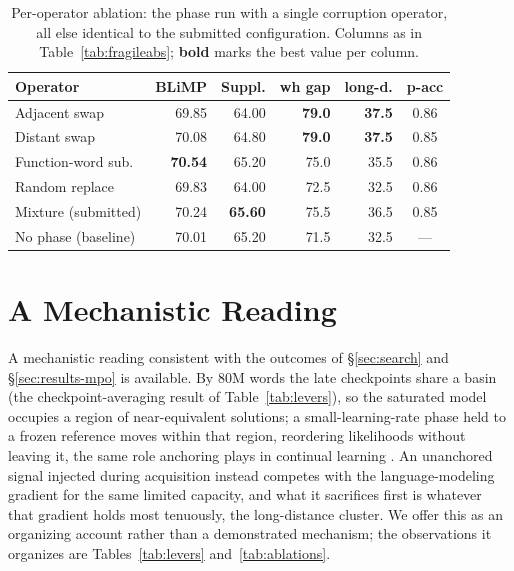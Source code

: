 \begin{table}[H]
  \centering
  \footnotesize
  \setlength{\tabcolsep}{2pt}
  \begin{tabular}{@{}lrrrrc@{}}
    \toprule
    \textbf{Operator} & \textbf{BLiMP} & \textbf{Suppl.} & \textbf{wh gap} & \textbf{long-d.} & \textbf{p-acc} \\
    \midrule
    Adjacent swap    & 69.85 & 64.00 & \textbf{79.0} & \textbf{37.5} & 0.86 \\
    Distant swap     & 70.08 & 64.80 & \textbf{79.0} & \textbf{37.5} & 0.85 \\
    Function-word sub. & \textbf{70.54} & 65.20 & 75.0 & 35.5 & 0.86 \\
    Random replace   & 69.83 & 64.00 & 72.5 & 32.5 & 0.86 \\
    \midrule
    Mixture (submitted) & 70.24 & \textbf{65.60} & 75.5 & 36.5 & 0.85 \\
    No phase (baseline) & 70.01 & 65.20 & 71.5 & 32.5 & --- \\
    \bottomrule
  \end{tabular}
  \caption{Per-operator ablation: the \MPO{} phase run with a single
  corruption operator, all else identical to the submitted configuration.
  Columns as in Table~\ref{tab:fragileabs}; \textbf{bold} marks the best
  value per column.}
  \label{tab:ops}
\end{table}



\section{A Mechanistic Reading}
\label{sec:app-mech}

A mechanistic reading consistent with the outcomes of \S\ref{sec:search}
and \S\ref{sec:results-mpo} is available. By 80M words the late
checkpoints share a basin (the checkpoint-averaging result of
Table~\ref{tab:levers}), so the saturated model occupies a region of
near-equivalent solutions; a small-learning-rate phase held to a frozen
reference moves within that region, reordering likelihoods without
leaving it, the same role anchoring plays in continual learning
\citep{kirkpatrick2017ewc}. An unanchored signal injected during
acquisition instead competes with the language-modeling gradient for the
same limited capacity, and what it sacrifices first is whatever that
gradient holds most tenuously, the long-distance cluster. We offer this
as an organizing account rather than a demonstrated mechanism; the
observations it organizes are Tables~\ref{tab:levers}
and~\ref{tab:ablations}.
